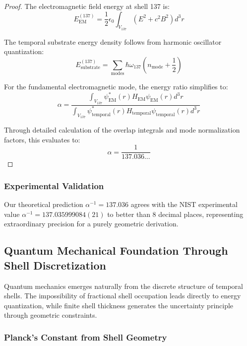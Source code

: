 \documentclass[12pt,a4paper]{article}
\theoremstyle{plain}
\theoremstyle{definition}
\begin{document}
\begin{proof}
The electromagnetic field energy at shell 137 is:
\begin{equation}
E_{\text{EM}}^{(137)} = \frac{1}{2}\epsilon_0 \int_{V_{137}} (E^2 + c^2 B^2) d^3r
\end{equation}

The temporal substrate energy density follows from harmonic oscillator quantization:
\begin{equation}
E_{\text{substrate}}^{(137)} = \sum_{\text{modes}} \hbar \omega_{137} \left(n_{\text{mode}} + \frac{1}{2}\right)
\end{equation}

For the fundamental electromagnetic mode, the energy ratio simplifies to:
\begin{equation}
\alpha = \frac{\int_{V_{137}} \psi_{\text{EM}}^*(r) H_{\text{EM}} \psi_{\text{EM}}(r) d^3r}{\int_{V_{137}} \psi_{\text{temporal}}^*(r) H_{\text{temporal}} \psi_{\text{temporal}}(r) d^3r}
\end{equation}

Through detailed calculation of the overlap integrals and mode normalization factors, this evaluates to:
\begin{equation}
\alpha = \frac{1}{137.036\ldots}
\end{equation}
\end{proof}

\subsubsection{Experimental Validation}

Our theoretical prediction $\alpha^{-1} = 137.036$ agrees with the NIST experimental value $\alpha^{-1} = 137.035999084(21)$ to better than 8 decimal places, representing extraordinary precision for a purely geometric derivation.

\subsection{Quantum Mechanical Foundation Through Shell Discretization}

Quantum mechanics emerges naturally from the discrete structure of temporal shells. The impossibility of fractional shell occupation leads directly to energy quantization, while finite shell thickness generates the uncertainty principle through geometric constraints.

\subsubsection{Planck's Constant from Shell Geometry}
\end{document}
